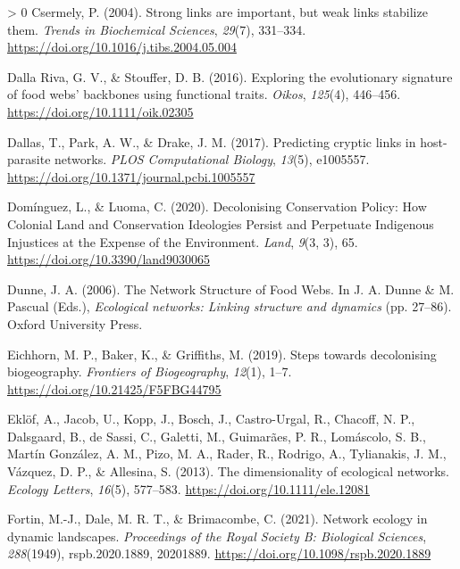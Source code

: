 \documentclass[10pt,oneside]{article}
\newlength{\cslhangindent}
\newenvironment{CSLReferences}[3] %
 {%
  \setlength{\parindent}{0pt}
  \ifodd #1 \everypar{\setlength{\hangindent}{\cslhangindent}}\ignorespaces\fi
  \ifnum #2 > 0
  \setlength{\parskip}{#2\baselineskip}
  \fi
 }%
 {}
\begin{document}
\begin{CSLReferences}{1}{0}
\leavevmode\hypertarget{ref-Csermely2004StrLin}{}%
Csermely, P. (2004). Strong links are important, but weak links
stabilize them. \emph{Trends in Biochemical Sciences}, \emph{29}(7),
331--334. \url{https://doi.org/10.1016/j.tibs.2004.05.004}

\leavevmode\hypertarget{ref-DallaRiva2016ExpEvo}{}%
Dalla Riva, G. V., \& Stouffer, D. B. (2016). Exploring the evolutionary
signature of food webs' backbones using functional traits. \emph{Oikos},
\emph{125}(4), 446--456. \url{https://doi.org/10.1111/oik.02305}

\leavevmode\hypertarget{ref-Dallas2017PreCry}{}%
Dallas, T., Park, A. W., \& Drake, J. M. (2017). Predicting cryptic
links in host-parasite networks. \emph{PLOS Computational Biology},
\emph{13}(5), e1005557.
\url{https://doi.org/10.1371/journal.pcbi.1005557}

\leavevmode\hypertarget{ref-Dominguez2020DecCon}{}%
Domínguez, L., \& Luoma, C. (2020). Decolonising Conservation Policy:
How Colonial Land and Conservation Ideologies Persist and Perpetuate
Indigenous Injustices at the Expense of the Environment. \emph{Land},
\emph{9}(3, 3), 65. \url{https://doi.org/10.3390/land9030065}

\leavevmode\hypertarget{ref-Dunne2006NetStr}{}%
Dunne, J. A. (2006). The Network Structure of Food Webs. In J. A. Dunne
\& M. Pascual (Eds.), \emph{Ecological networks: Linking structure and
dynamics} (pp. 27--86). Oxford University Press.

\leavevmode\hypertarget{ref-Eichhorn2019SteDec}{}%
Eichhorn, M. P., Baker, K., \& Griffiths, M. (2019). Steps towards
decolonising biogeography. \emph{Frontiers of Biogeography},
\emph{12}(1), 1--7. \url{https://doi.org/10.21425/F5FBG44795}

\leavevmode\hypertarget{ref-Eklof2013DimEco}{}%
Eklöf, A., Jacob, U., Kopp, J., Bosch, J., Castro-Urgal, R., Chacoff, N.
P., Dalsgaard, B., de Sassi, C., Galetti, M., Guimarães, P. R.,
Lomáscolo, S. B., Martín González, A. M., Pizo, M. A., Rader, R.,
Rodrigo, A., Tylianakis, J. M., Vázquez, D. P., \& Allesina, S. (2013).
The dimensionality of ecological networks. \emph{Ecology Letters},
\emph{16}(5), 577--583. \url{https://doi.org/10.1111/ele.12081}

\leavevmode\hypertarget{ref-Fortin2021NetEco}{}%
Fortin, M.-J., Dale, M. R. T., \& Brimacombe, C. (2021). Network ecology
in dynamic landscapes. \emph{Proceedings of the Royal Society B:
Biological Sciences}, \emph{288}(1949), rspb.2020.1889, 20201889.
\url{https://doi.org/10.1098/rspb.2020.1889}


\end{CSLReferences}
\end{document}
